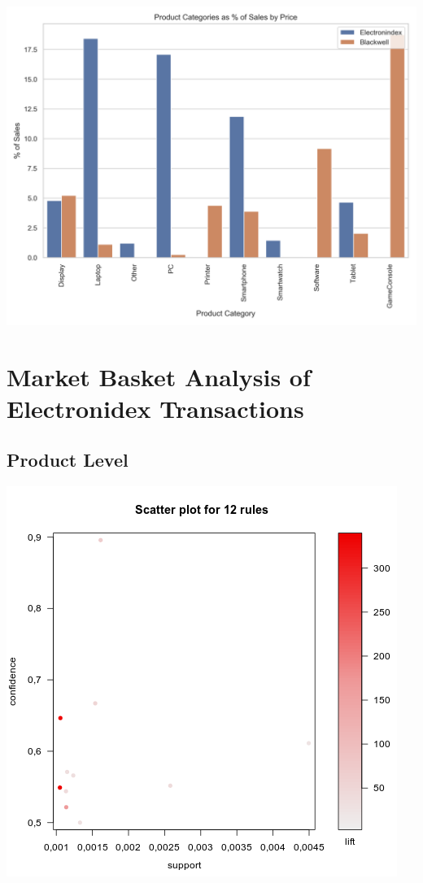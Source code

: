 \documentclass[12pt,a4paper,leqno]{report}
\theoremstyle{plain}
\theoremstyle{definition}
\theoremstyle{remark}
\begin{document}
\bigskip
{
    \centering
    \includegraphics[width=\textwidth,height=\textheight,keepaspectratio]{sales_distribution_of_product_categories_by_price_no_accessories.png}
    \par
}
\bigskip

\section{Market Basket Analysis of Electronidex Transactions}

\subsection{Product Level}

\bigskip
{
    \centering
    \includegraphics[width=\textwidth,height=\textheight,keepaspectratio]{apriori_product_level_plot.png}
    \par
}
\bigskip
\end{document}
